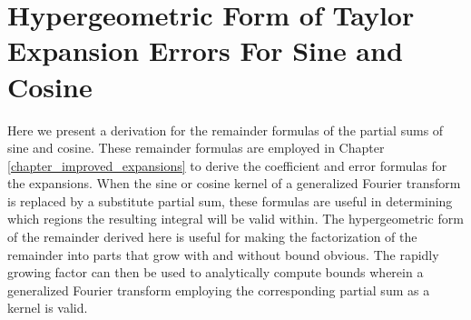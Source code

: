 \section{Hypergeometric Form of Taylor Expansion Errors For Sine and Cosine}
\label{appendix_hyper_form}
Here we present a derivation for the remainder formulas of the partial sums of sine and cosine.  These remainder formulas are employed in Chapter \ref{chapter_improved_expansions} to derive the coefficient and error formulas for the expansions.  When the sine or cosine kernel of a generalized Fourier transform is replaced by a substitute partial sum, these formulas are useful in determining which regions the resulting integral will be valid within.  The hypergeometric form of the remainder derived here is useful for making the factorization of the remainder into parts that grow with and without bound obvious.  The rapidly growing factor can then be used to analytically compute bounds wherein a generalized Fourier transform employing the corresponding partial sum as a kernel is valid.


